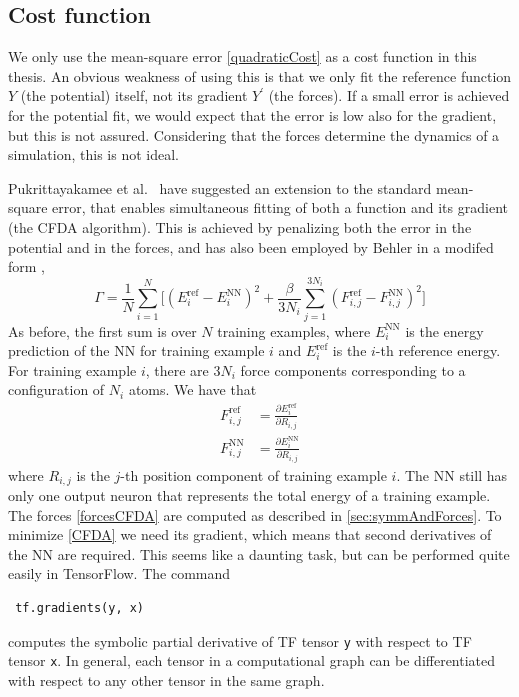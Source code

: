 \documentclass[twoside,english]{uiofysmaster}
\begin{document}
\subsection{Cost function} \label{sec:hyperParamsCostFunction}
We only use the mean-square error \eqref{quadraticCost} as a cost function in this thesis. 
An obvious weakness of using this is that we only fit the reference function $Y$ (the potential) itself, 
not its gradient $Y^\prime$ (the forces). If a small error is achieved for the potential fit, we would expect that 
the error is low also for the gradient, but this is not assured. Considering that the forces determine the 
dynamics of a simulation, this is not ideal. 

Pukrittayakamee et al.\ \cite{Pukrittayakamee09} have suggested an extension to the standard mean-square error, that 
enables simultaneous fitting of both a function and its gradient (the CFDA algorithm). 
This is achieved by penalizing both the error 
in the potential and in the forces, and has also been employed by Behler in a modifed form \cite{Behler15},
\begin{equation}
 \Gamma = \frac{1}{N}\sum_{i=1}^N \biggr[(E_i^{\mathrm{ref}} - E_i^{\mathrm{NN}})^2 + 
 \frac{\beta}{3N_i}\sum_{j=1}^{3N_i} (F_{i,j}^{\mathrm{ref}} - F_{i,j}^{\mathrm{NN}})^2 \biggr]
 \label{CFDA}
\end{equation}
As before, the first sum is over $N$ training examples, where $E_i^{\mathrm{NN}}$
is the energy prediction of the NN for training example $i$ and $E_i^{\mathrm{ref}}$ is the $i$-th reference energy. 
For training example $i$, there are $3N_i$ force components corresponding to a configuration of $N_i$ atoms. We have that 
\begin{align}
 F_{i,j}^{\mathrm{ref}} &= \frac{\partial E_i^{\mathrm{ref}}}{\partial R_{i,j}} \\
 F_{i,j}^{\mathrm{NN}} &= \frac{\partial E_i^{\mathrm{NN}}}{\partial R_{i,j}}
 \label{forcesCFDA}
\end{align}
where $R_{i,j}$ is the $j$-th position component of training example $i$. The NN still has only one output neuron
that represents the total energy of a training example. The forces \eqref{forcesCFDA} are computed as
described in \autoref{sec:symmAndForces}.
To minimize \eqref{CFDA} we need its gradient, which means that second derivatives of the NN 
are required. This seems like a daunting task, but can be performed quite easily in TensorFlow. 
The command
\begin{verbatim}
 tf.gradients(y, x)
\end{verbatim}
computes the symbolic partial derivative of TF tensor \texttt{y} with respect to TF tensor \texttt{x}. In general, each tensor 
in a computational graph can be differentiated with respect to any other tensor in the same graph. 
\end{document}
